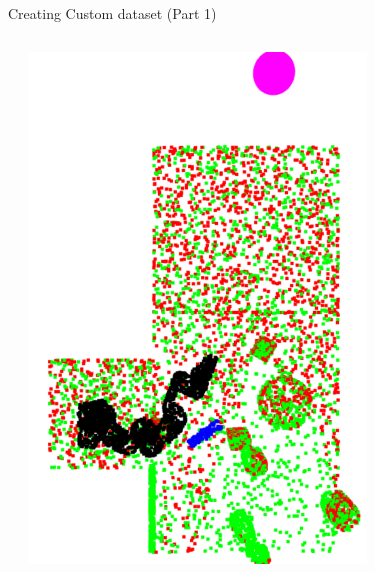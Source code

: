 \documentclass{beamer}
\begin{document}
\begin{frame}[t]{Creating Custom dataset (Part 1)}
\begin{columns}
\begin{column}{.4\textwidth}
		\end{column}
		\begin{column}{.3\textwidth}
                \includegraphics[width=0.7\textwidth]{./img/ds_2.png}
		\end{column}
	\end{columns}
\end{frame}
\end{document}
